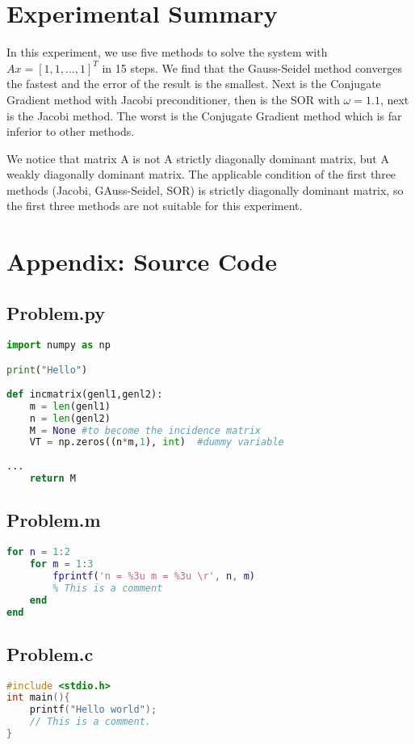 \documentclass{ExpReport}
\begin{document}
    
    \section{Experimental Summary}

    In this experiment, we use five methods to solve the system with $Ax = [1, 1, 
    ... , 1]^T$ in 15 steps. We find that the Gauss-Seidel method converges the fastest and the error of the result is the smallest. Next is the Conjugate Gradient method with Jacobi preconditioner, then is the SOR with $\omega=1.1$, next is the Jacobi method. The worst is the Conjugate Gradient method which is far inferior to other methods.

    We notice that matrix A is not A strictly diagonally dominant matrix, but A weakly diagonally dominant matrix. The applicable condition of the first three methods (Jacobi, GAuss-Seidel, SOR) is strictly diagonally dominant matrix, so the first three methods are not suitable for this experiment.
\newpage
\appendix
\section{Appendix: Source Code}
\subsection{Problem.py}
\begin{lstlisting}[language=Python]
import numpy as np

print("Hello")
    
def incmatrix(genl1,genl2):
    m = len(genl1)
    n = len(genl2)
    M = None #to become the incidence matrix
    VT = np.zeros((n*m,1), int)  #dummy variable
    
...
    return M
\end{lstlisting}

\subsection{Problem.m}
\begin{lstlisting}[language=matlab]
for n = 1:2
    for m = 1:3
        fprintf('n = %3u m = %3u \r', n, m)
        % This is a comment
    end
end
\end{lstlisting}

\subsection{Problem.c}
\begin{lstlisting}[language=c]
#include <stdio.h>
int main(){
    printf("Hello world");
    // This is a comment.
}
\end{lstlisting}
\end{document}
